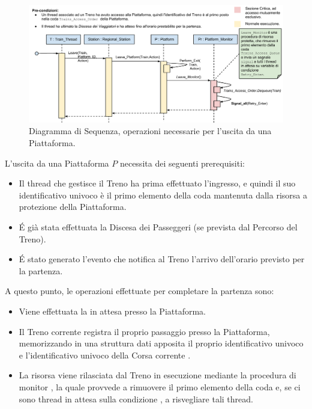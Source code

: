 \begin{description}
		\begin{figure}[htbp]
			\includegraphics[trim = 50mm 0mm 0mm 0mm,scale=0.55]{imgs/platform_exit_Sequence_Diagram.pdf}
			\caption{\footnotesize{Diagramma di Sequenza, operazioni necessarie per l'uscita da una Piattaforma.}}
			\label{fig:platform_access}
		\end{figure}
		
		L'uscita da una Piattaforma $P$ necessita dei seguenti prerequisiti:
		
			\begin{itemize}
				\item Il thread che gestisce il Treno ha prima effettuato l'ingresso, e quindi il suo identificativo univoco è il primo elemento della coda  mantenuta dalla risorsa  a protezione della Piattaforma.
				\item \'E già stata effettuata la Discesa dei Passeggeri (se prevista dal Percorso del Treno).
				\item \'E stato generato l'evento che notifica al Treno l'arrivo dell'orario previsto per la partenza.
			\end{itemize}
		
		A questo punto, le operazioni effettuate per completare la partenza sono:
		
			\begin{itemize}
				\item Viene effettuata la  in attesa presso la Piattaforma. 
				\item Il Treno corrente registra il proprio passaggio presso la Piattaforma, memorizzando in una struttura dati apposita  il proprio identificativo univoco e l'identificativo univoco della Corsa corrente .
				\item La risorsa viene rilasciata dal Treno in esecuzione mediante la procedura di monitor , la quale provvede a rimuovere il primo elemento della coda  e, se ci sono thread in attesa sulla condizione , a risvegliare tali thread.
			\end{itemize}
		

\end{description}
